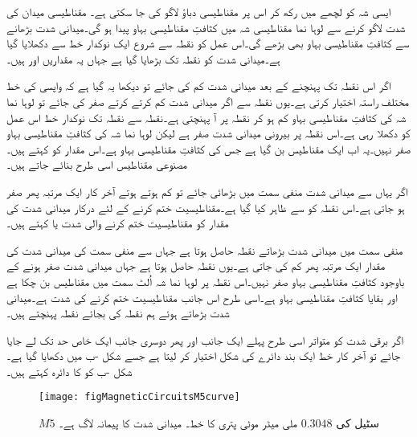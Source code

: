 	ایسی شہ کو لچھے میں رکھ کر اس پر مقناطیسی دباؤ لاگو کی جا سکتی ہے۔ مقناطیسی میدان کی شدت   لاگو کرنے سے لوہا نما مقناطیسی شہ میں کثافتِ مقناطیسی بہاو   پیدا ہو گی۔میدانی شدت بڑھانے سے کثافتِ مقناطیسی بہاو بھی بڑھے گی۔اس عمل کو نقطہ   سے شروع ایک نوکدار خط سے دکھلایا گیا ہے۔میدانی شدت کو نقطہ   تک بڑھایا گیا ہے جہاں یہ مقداریں   اور  ہیں۔

	اگر اس نقطہ تک پہنچنے کے بعد میدانی شدت کم کی جائے تو دیکھا یہ گیا ہے کہ واپسی کی خط مختلف راستہ اختیار کرتی ہے۔یوں نقطہ   سے اگر میدانی شدت کم کرتے کرتے صفر کی جائے تو لوہا نما شہ کی کثافتِ مقناطیسی بہاو کم ہو کر نقطہ  پر آ پہنچتی ہے۔نقطہ  سے نقطہ  تک نوکدار خط اس عمل کو دکھلا رہی ہے۔اس نقطہ پر بیرونی میدانی شدت صفر ہے لیکن لوہا نما شہ کی کثافتِ مقناطیسی بہاو صفر نہیں۔یہ اب ایک مقناطیس بن گیا ہے جس کی کثافتِ مقناطیسی بہاو   ہے۔اس مقدار کو   کہتے ہیں۔مصنوعی مقناطیس اسی طرح بنائے جاتے ہیں۔

اگر یہاں سے میدانی شدت منفی سمت میں بڑھائی جائے تو  کم ہوتے ہوتے آخر کار ایک مرتبہ پھر صفر ہو جاتی ہے۔اس نقطہ کو  سے ظاہر کیا گیا ہے۔مقناطیسیت ختم کرنے کے لئے درکار میدانی شدت کی مقدار   کو مقناطیسیت ختم کرنے والی شدت یا  کہتے ہیں۔

منفی سمت میں میدانی شدت بڑھاتے نقطہ  حاصل ہوتا ہے جہاں سے منفی سمت کی میدانی شدت کی مقدار ایک مرتبہ پھر کم کی جاتی ہے۔یوں نقطہ  حاصل ہوتا ہے جہاں میدانی شدت صفر ہونے کے باوجود کثافتِ مقناطیسی بہاو صفر نہیں۔اس نقطہ پر لوہا نما شہ اُلٹ سمت میں مقناطیس بن چکا ہے اور  بقایا کثافتِ مقناطیسی بہاو ہے۔اسی طرح اس جانب مقناطیسیت ختم کرنے کی شدت  ہے۔میدانی شدت بڑھاتے ہوئے ہم نقطہ  کی بجائے نقطہ  پہنچتے ہیں۔

اگر برقی شدت کو متواتر اسی طرح پہلے ایک جانب اور پھر دوسری جانب  ایک خاص حد تک لے جایا جائے تو آخر کار   خط ایک بند دائرے کی شکل اختیار کر لیتا ہے جسے شکل -ب میں دکھایا گیا ہے۔شکل -ب کو   کا دائرہ  کہتے ہیں۔
\begin{figure}
\centering
\texttt{[image: figMagneticCircuitsM5curve]}
\caption{$M5$ سٹیل کی $0.3048$ ملی میٹر موٹی پتری کا خط۔ میدانی شدت کا پیمانہ لاگ ہے۔}
\label{شکل_مقناطیسی_ادوار_ایم_پانچ_پتری_کا_خط}
\end{figure}


